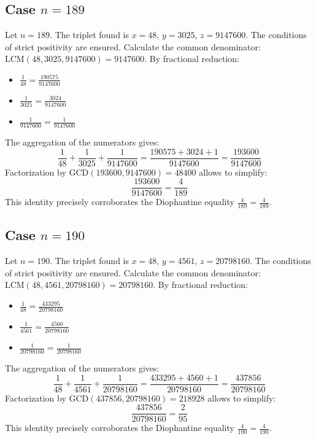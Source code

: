 \documentclass[11pt,a4paper]{article}
\begin{document}
\subsection{Case $n = 189$}
Let $n = 189$. The triplet found is $x = 48$, $y = 3025$, $z = 9147600$.
The conditions of strict positivity are ensured.
Calculate the common denominator: $\text{LCM}(48, 3025, 9147600) = 9147600$.
By fractional reduction:
\begin{itemize}
    \item $\frac{1}{48} = \frac{190575}{9147600}$
    \item $\frac{1}{3025} = \frac{3024}{9147600}$
    \item $\frac{1}{9147600} = \frac{1}{9147600}$
\end{itemize}
The aggregation of the numerators gives:
$$ \frac{1}{48} + \frac{1}{3025} + \frac{1}{9147600} = \frac{190575 + 3024 + 1}{9147600} = \frac{193600}{9147600} $$
Factorization by $\text{GCD}(193600, 9147600) = 48400$ allows to simplify:
$$ \frac{193600}{9147600} = \frac{4}{189} $$
This identity precisely corroborates the Diophantine equality $\frac{4}{189} = \frac{4}{189}$.

\subsection{Case $n = 190$}
Let $n = 190$. The triplet found is $x = 48$, $y = 4561$, $z = 20798160$.
The conditions of strict positivity are ensured.
Calculate the common denominator: $\text{LCM}(48, 4561, 20798160) = 20798160$.
By fractional reduction:
\begin{itemize}
    \item $\frac{1}{48} = \frac{433295}{20798160}$
    \item $\frac{1}{4561} = \frac{4560}{20798160}$
    \item $\frac{1}{20798160} = \frac{1}{20798160}$
\end{itemize}
The aggregation of the numerators gives:
$$ \frac{1}{48} + \frac{1}{4561} + \frac{1}{20798160} = \frac{433295 + 4560 + 1}{20798160} = \frac{437856}{20798160} $$
Factorization by $\text{GCD}(437856, 20798160) = 218928$ allows to simplify:
$$ \frac{437856}{20798160} = \frac{2}{95} $$
This identity precisely corroborates the Diophantine equality $\frac{4}{190} = \frac{4}{190}$.
\end{document}

